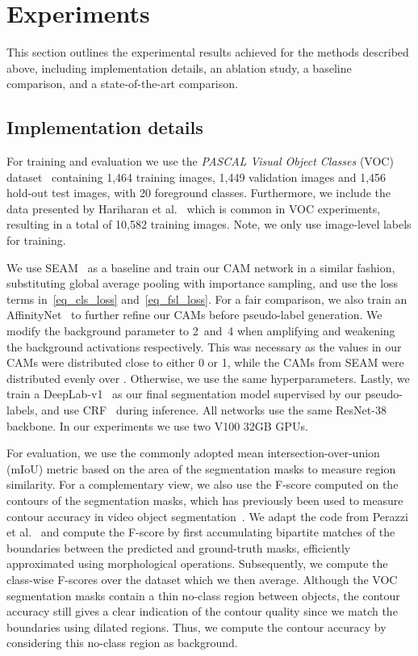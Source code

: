 \documentclass{article}
\begin{document}
\section{Experiments}

This section outlines the experimental results achieved for the methods described above, including implementation details, an ablation study, a baseline comparison, and a state-of-the-art comparison.

\subsection{Implementation details}
\label{sec_implementation_details}

For training and evaluation we use the \textit{PASCAL Visual Object Classes} (VOC) dataset~\cite{everingham2010ijvc} containing 1,464 training images, 1,449 validation images and 1,456 hold-out test images, with 20 foreground classes. Furthermore, we include the data presented by Hariharan et al.~\cite{hariharan2011iccv} which is common in VOC experiments, resulting in a total of 10,582 training images. Note, we only use image-level labels for training.

We use SEAM~\cite{wang2020cvpr} as a baseline and train our CAM network in a similar fashion, substituting global average pooling with importance sampling, and use the loss terms in~\eqref{eq_cls_loss} and~\eqref{eq_fsl_loss}. For a fair comparison, we also train an AffinityNet~\cite{ahn2018cvpr} to further refine our CAMs before pseudo-label generation. We modify the background parameter  to 2~and~4 when amplifying and weakening the background activations respectively. This was necessary as the values in our CAMs were distributed close to either 0 or 1, while the CAMs from SEAM were distributed evenly over . Otherwise, we use the same hyperparameters. Lastly, we train a DeepLab-v1~\cite{chen2015iclr} as our final segmentation model supervised by our pseudo-labels, and use CRF~\cite{krahenbuhl2011neurips} during inference. All networks use the same ResNet-38~\cite{wu2019pr} backbone. In our experiments we use two V100 32GB GPUs.

For evaluation, we use the commonly adopted mean intersection-over-union (mIoU) metric based on the area of the segmentation masks to measure region similarity. For a complementary view, we also use the F-score computed on the contours of the segmentation masks, which has previously been used to measure contour accuracy in video object segmentation~\cite{perazzi2016cvpr}. We adapt the code from Perazzi et al.~\cite{perazzi2016cvpr} and compute the F-score by first accumulating bipartite matches of the boundaries between the predicted and ground-truth masks, efficiently approximated using morphological operations. Subsequently, we compute the class-wise F-scores over the dataset which we then average. Although the VOC segmentation masks contain a thin no-class region between objects, the contour accuracy still gives a clear indication of the contour quality since we match the boundaries using dilated regions. Thus, we compute the contour accuracy by considering this no-class region as background.
\end{document}
